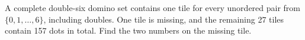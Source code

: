 A complete double-six domino set contains one tile for every unordered pair from $\{0,1,\ldots,6\}$, including doubles. One tile is missing, and the remaining 27 tiles contain 157 dots in total. Find the two numbers on the missing tile.
